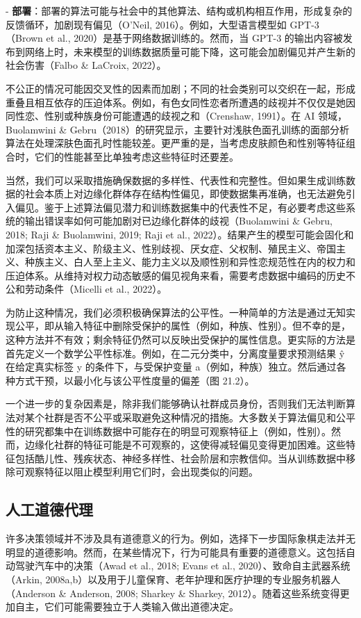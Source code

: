 - \textbf{部署}：部署的算法可能与社会中的其他算法、结构或机构相互作用，形成复杂的反馈循环，加剧现有偏见（O’Neil, 2016）。例如，大型语言模型如 GPT-3（Brown et al., 2020）是基于网络数据训练的。然而，当 GPT-3 的输出内容被发布到网络上时，未来模型的训练数据质量可能下降，这可能会加剧偏见并产生新的社会伤害（Falbo \& LaCroix, 2022）。


不公正的情况可能因交叉性的因素而加剧；不同的社会类别可以交织在一起，形成重叠且相互依存的压迫体系。例如，有色女同性恋者所遭遇的歧视并不仅仅是她因同性恋、性别或种族身份可能遭遇的歧视之和（Crenshaw, 1991）。在 AI 领域，Buolamwini \& Gebru（2018）的研究显示，主要针对浅肤色面孔训练的面部分析算法在处理深肤色面孔时性能较差。更严重的是，当考虑皮肤颜色和性别等特征组合时，它们的性能甚至比单独考虑这些特征时还要差。

当然，我们可以采取措施确保数据的多样性、代表性和完整性。但如果生成训练数据的社会本质上对边缘化群体存在结构性偏见，即使数据集再准确，也无法避免引入偏见。鉴于上述算法偏见潜力和训练数据集中的代表性不足，有必要考虑这些系统的输出错误率如何可能加剧对已边缘化群体的歧视（Buolamwini \& Gebru, 2018; Raji \& Buolamwini, 2019; Raji et al., 2022）。结果产生的模型可能会固化和加深包括资本主义、阶级主义、性别歧视、厌女症、父权制、殖民主义、帝国主义、种族主义、白人至上主义、能力主义以及顺性别和异性恋规范性在内的权力和压迫体系。从维持对权力动态敏感的偏见视角来看，需要考虑数据中编码的历史不公和劳动条件（Micelli et al., 2022）。

为防止这种情况，我们必须积极确保算法的公平性。一种简单的方法是通过无知实现公平，即从输入特征中删除受保护的属性（例如，种族、性别）。但不幸的是，这种方法并不有效；剩余特征仍然可以反映出受保护的属性信息。更实际的方法是首先定义一个数学公平性标准。例如，在二元分类中，分离度量要求预测结果 ŷ 在给定真实标签 y 的条件下，与受保护变量 a（例如，种族）独立。然后通过各种方式干预，以最小化与该公平性度量的偏差（图 21.2）。

一个进一步的复杂因素是，除非我们能够确认社群成员身份，否则我们无法判断算法对某个社群是否不公平或采取避免这种情况的措施。大多数关于算法偏见和公平性的研究都集中在训练数据中可能存在的明显可观察特征上（例如，性别）。然而，边缘化社群的特征可能是不可观察的，这使得减轻偏见变得更加困难。这些特征包括酷儿性、残疾状态、神经多样性、社会阶层和宗教信仰。当从训练数据中移除可观察特征以阻止模型利用它们时，会出现类似的问题。

\subsection{人工道德代理}
许多决策领域并不涉及具有道德意义的行为。例如，选择下一步国际象棋走法并无明显的道德影响。然而，在某些情况下，行为可能具有重要的道德意义。这包括自动驾驶汽车中的决策（Awad et al., 2018; Evans et al., 2020）、致命自主武器系统（Arkin, 2008a,b）以及用于儿童保育、老年护理和医疗护理的专业服务机器人（Anderson \& Anderson, 2008; Sharkey \& Sharkey, 2012）。随着这些系统变得更加自主，它们可能需要独立于人类输入做出道德决定。

